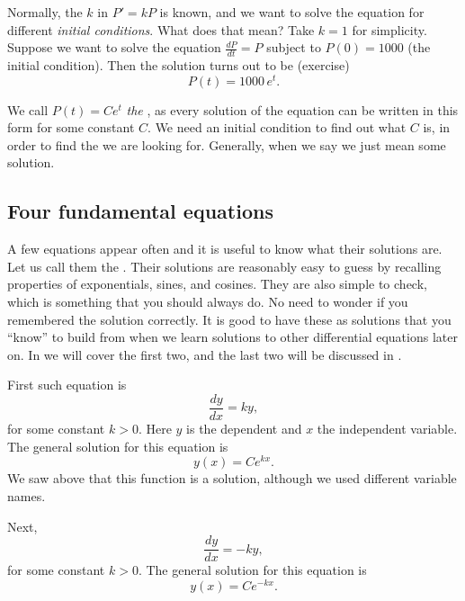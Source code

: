 Normally, the $k$ in $P' = kP$ is known,
and we want to solve
the equation for different \emph{initial conditions}.
What does that mean?
Take $k=1$ for simplicity.  Suppose we want to solve the equation
$\frac{dP}{dt} = P$ 
subject to $P(0) = 1000$ (the initial condition).
Then the solution turns out to be (exercise)
\begin{equation*}
P(t) = 1000 \, e^t .
\end{equation*}


We call $P(t) = C e^t$ \emph{the },
as every solution
of the equation can be written in this form for some constant $C$.  We
need an initial condition to find out what $C$ is, in order to find the
\emph{} we are looking for.  Generally, when we say
 we just mean some solution.

\subsection{Four fundamental equations} \label{subsection:fourfundamental}

A few equations appear often and
it is useful to know what
their solutions are.
Let us call them the .
Their solutions
are reasonably easy
to guess by recalling properties of exponentials, sines, and cosines.
They are also simple to check, which is something that you should always do.
No need to wonder if you remembered the solution correctly. It is good to have these as solutions that you ``know'' to build from when we learn solutions to other differential equations later on. In  we will cover the first two, and the last two will be discussed in . 

\medskip

First such equation is
\begin{equation*}
\frac{dy}{dx} = k y ,
\end{equation*}
for some constant $k > 0$.
Here $y$ is the dependent and $x$ the independent variable.
The general solution for this equation is
\begin{equation*}
y(x) = C e^{kx} .
\end{equation*}
We saw above that this function is a solution, although we used different
variable names.

\medskip

Next,
\begin{equation*}
\frac{dy}{dx} = -k y ,
\end{equation*}
for some constant $k > 0$.
The general solution for this equation is
\begin{equation*}
y(x) = C e^{-kx} .
\end{equation*}

